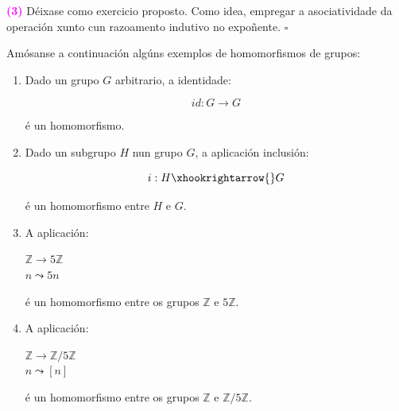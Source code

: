 \documentclass[twoside]{report}
\newcommand{\magbf}[1]{\textcolor{magenta}{\textbf{#1}}} %
\theoremstyle{mystyle}
\begin{document}
\vspace{3mm}

\noindent \magbf{(3)} Déixase como exercicio proposto. Como idea, empregar a asociatividade da operación xunto cun razoamento indutivo no expoñente. $\square$

\vspace{3mm}

\noindent Amósanse a continuación algúns exemplos de homomorfismos de grupos: 

\begin{enumerate}
    \item Dado un grupo $G$ arbitrario, a identidade:
    
    $$ id: G \longrightarrow G $$
    
    é un homomorfismo.
    
    \vspace{2mm}
    
    \item Dado un subgrupo $H$ nun grupo $G$, a aplicación inclusión:
    
    $$ i : H \xhookrightarrow{} G$$
    
    é un homomorfismo entre $H$ e $G$.
    
    \vspace{2mm}
    
    \item A aplicación:
    
    \begin{center}
        $\mathbb{Z} \longrightarrow 5\mathbb{Z}$ \\
        \vspace{2mm}
        $n \leadsto 5n$
    \end{center}  
    
    é un homomorfismo entre os grupos $\mathbb{Z}$ e $5\mathbb{Z}$.
    
    \vspace{2mm}
    
    \item A aplicación:
    
    \begin{center}
        $\mathbb{Z} \longrightarrow \mathbb{Z}/5\mathbb{Z}$ \\
        \vspace{2mm}
        $n \leadsto [n]$
    \end{center} 
    
    é un homomorfismo entre os grupos $\mathbb{Z}$ e $\mathbb{Z}/5\mathbb{Z}$.
    

\end{enumerate}
\end{document}
